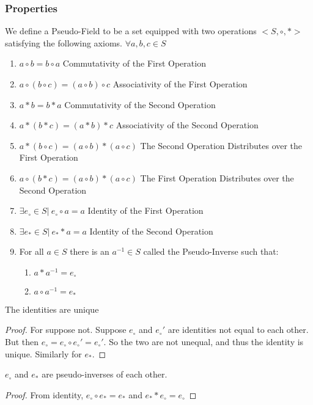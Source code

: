 \documentclass[crop=false,class=book]{standalone}
\begin{document}
\subsubsection{Properties}
We define a Pseudo-Field to be a set equipped with two operations $<S,\circ, *>$ satisfying the following axioms.
$\forall a,b,c \in S$
\begin{enumerate}
    \item $a\circ b = b\circ a$ \hfill Commutativity of the First Operation
    \item $a\circ (b\circ c)=(a \circ b)\circ c$ \hfill Associativity of the First Operation
    \item $a*b = b*a$ \hfill Commutativity of the Second Operation
    \item $a*(b*c) = (a*b)*c$ \hfill Associativity of the Second Operation
    \item $a*(b\circ c)=(a\circ b)*(a\circ c)$ \hfill The Second Operation Distributes over the First Operation
    \item $a\circ (b*c) = (a\circ b)*(a\circ c)$ \hfill The First Operation Distributes over the Second Operation
    \item $\exists e_{\circ}\in S|\ e_{\circ}\circ a = a$ \hfill Identity of the First Operation
    \item $\exists e_{*} \in S|\ e_{*}*a = a$ \hfill Identity of the Second Operation
    \item For all $a\in S$ there is an $a^{-1}\in S$ called the Pseudo-Inverse such that:
    \begin{enumerate}
        \item $a*a^{-1} = e_{\circ}$
        \item $a\circ a^{-1}=e_{*}$
    \end{enumerate}
\end{enumerate}
\begin{theorem} The identities are unique
\end{theorem}
\begin{proof} For suppose not. Suppose $e_{\circ}$ and $e_{\circ}'$ are identities not equal to each other. But then $e_{\circ}=e_{\circ}\circ e_{\circ}'=e_{\circ}'$. So the two are not unequal, and thus the identity is unique. Similarly for $e_{*}$.
\end{proof}
\begin{theorem} $e_{\circ}$ and $e_{*}$ are pseudo-inverses of each other.
\end{theorem}
\begin{proof} From identity, $e_{\circ}\circ e_{*}=e_{*}$ and $e_{*}*e_{\circ}=e_{\circ}$
\end{proof}
\end{document}
